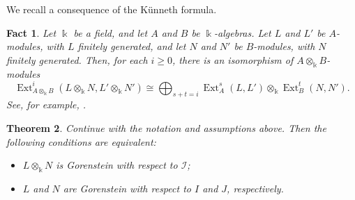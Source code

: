 \documentclass[10pt,a4paper]{amsart}
\newtheorem{theorem}{Theorem}[section]
\numberwithin{equation}{theorem}
\theoremstyle{definition}
\theoremstyle{fact}
\newtheorem{fact}[theorem]{Fact}
\theoremstyle{conjecture}
\newcommand{\Ext}{\operatorname{Ext}}
\begin{document}
We recall a consequence of the K\"unneth formula.
\begin{fact}
\label{2.3}
\em
Let $\Bbbk$ be a field, and let $A$ and $B$ be $\Bbbk$-algebras. Let $L$ and $L'$ be $A$-modules, with $L$ finitely generated, and let $N$ and $N'$ be $B$-modules, with $N$ finitely generated. Then, for each $i\geq 0$, there is an isomorphism of $A\otimes_{\Bbbk}B$-modules
\[
\Ext^i_{A\otimes_{\Bbbk}B}
(L\otimes_{\Bbbk}N,L'\otimes_{\Bbbk}N')
\cong
\bigoplus_{s+t=i}
\Ext^s_A(L,L')\otimes_{\Bbbk}
\Ext^t_B(N,N').
\]
See, for example, \cite[Proposition A.1.5]{W}.
\end{fact}


\begin{theorem}
\label{2.4}
Continue with the notation and assumptions above. Then the following
conditions are equivalent:
\begin{itemize}
\item[(a)] $L\otimes_{\Bbbk} N$ is Gorenstein with respect to
$\mathcal{I}$;
\item[(b)] $L$ and $N$ are Gorenstein with respect to $I$ and $J$,
respectively.
\end{itemize}
\end{theorem}
\end{document}
